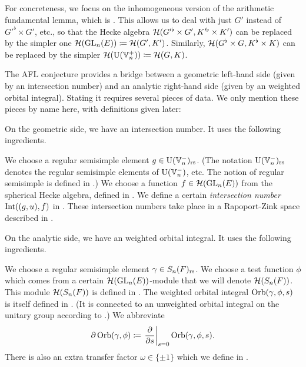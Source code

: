 For concreteness, we focus on the inhomogeneous version
of the arithmetic fundamental lemma, which is \cite[Conjecture 6.2.1]{ref:AFLspherical}.
This allows us to deal with just $G'$ instead of $G'^\flat \times G'$, etc.,
so that the Hecke algebra $\mathcal H(G'^\flat \times G', K'^\flat \times K')$
can be replaced by the simpler one $\mathcal H(\operatorname{GL}_n(E)) \coloneqq \mathcal H(G', K')$.
Similarly, $\mathcal H(G^\flat \times G, K^\flat \times K)$
can be replaced by the simpler $\mathcal H(\operatorname{U}(\mathbb V_n^+)) \coloneqq \mathcal H(G, K)$.

The AFL conjecture provides a bridge between a geometric left-hand side
(given by an intersection number)
and an analytic right-hand side (given by an weighted orbital integral).
Stating it requires several pieces of data.
We only mention these pieces by name here, with definitions given later:
\begin{itemize}
  \ii On the geometric side, we have an intersection number.
  It uses the following ingredients.
  \begin{itemize}
    \ii We choose a regular semisimple element $g \in \operatorname{U}(\mathbb V_n^-)_{\mathrm{rs}}$.
    (The notation $\operatorname{U}(\mathbb V_n^-)_{\mathrm{rs}}$ denotes the regular semisimple elements of $\operatorname{U}(\mathbb V_n^-)$, etc.
    The notion of regular semisimple is defined in .)
    \ii We choose a function $f \in \mathcal H(\operatorname{GL}_n(E))$ from the spherical Hecke algebra,
    defined in .
    \ii We define a certain \emph{intersection number} $\operatorname{Int}((g,u), f)$
    in .
    These intersection numbers take place in a Rapoport-Zink space
    described in .
  \end{itemize}

  \ii On the analytic side, we have an weighted orbital integral.
  It uses the following ingredients.
  \begin{itemize}
    \ii We choose a regular semisimple element $\gamma \in S_n(F)_{\mathrm{rs}}$.
    \ii We choose a test function $\phi$ which comes
    from a certain $\mathcal H(\operatorname{GL}_n(E))$-module that we will denote $\mathcal H(S_n(F))$.
    This module $\mathcal H(S_n(F))$ is defined in .
    \ii The weighted orbital integral $\operatorname{Orb}(\gamma, \phi, s)$
    is itself defined in .
    (It is connected to an unweighted orbital integral on the unitary group
    according to .)
    We abbreviate
    \[ \partial \operatorname{Orb}(\gamma, \phi)
      \coloneqq \left. \pdv{}{s} \right\rvert_{s=0} \operatorname{Orb}(\gamma, \phi, s). \]
    \ii There is also an extra transfer factor $\omega \in \{\pm1\}$
    which we define in .
  \end{itemize}


\end{itemize}
